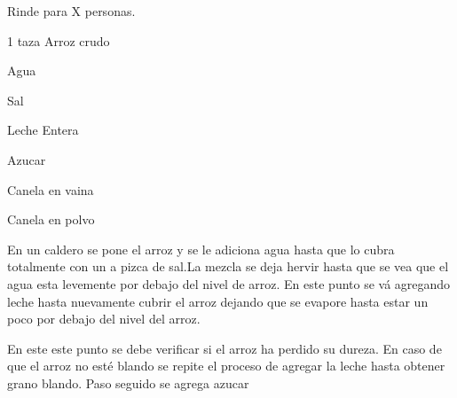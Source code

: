 
Rinde para X personas.


\begin{ingredientes}
\item 1 taza Arroz crudo
\item Agua
\item Sal
\item Leche Entera
\item Azucar
\item Canela en vaina
\item Canela en polvo
\end{ingredientes}
\preparacion

En un caldero se pone el arroz y se le adiciona agua hasta que lo cubra totalmente con un a pizca de sal.La mezcla se deja hervir hasta que se vea que el agua esta levemente por debajo del nivel de arroz. En este punto se vá agregando leche hasta nuevamente cubrir el arroz dejando que se evapore hasta estar un poco por debajo del nivel del arroz. 

En este este punto se debe verificar si el arroz ha perdido su dureza. En caso de que el arroz no esté blando se repite el proceso de agregar la leche hasta obtener grano blando. Paso seguido se agrega azucar